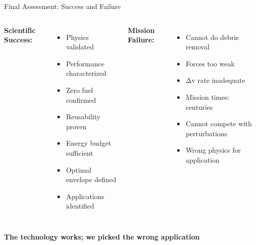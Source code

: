 \documentclass[aspectratio=169]{beamer}
\begin{document}
\begin{frame}{Final Assessment: Success and Failure}
\begin{columns}
\textbf{Scientific Success:}
\begin{itemize}
    \item[\textcolor{green}{\checkmark}] Physics validated
    \item[\textcolor{green}{\checkmark}] Performance characterized
    \item[\textcolor{green}{\checkmark}] Zero fuel confirmed
    \item[\textcolor{green}{\checkmark}] Reusability proven
    \item[\textcolor{green}{\checkmark}] Energy budget sufficient
    \item[\textcolor{green}{\checkmark}] Optimal envelope defined
    \item[\textcolor{green}{\checkmark}] Applications identified
\end{itemize}

\textbf{Mission Failure:}
\begin{itemize}
    \item[\textcolor{red}{\ding{55}}] Cannot do debris removal
    \item[\textcolor{red}{\ding{55}}] Forces too weak
    \item[\textcolor{red}{\ding{55}}] Δv rate inadequate
    \item[\textcolor{red}{\ding{55}}] Mission times: centuries
    \item[\textcolor{red}{\ding{55}}] Cannot compete with perturbations
    \item[\textcolor{red}{\ding{55}}] Wrong physics for application
\end{itemize}
\end{columns}

\vspace{1em}
\begin{center}
\textbf{The technology works; we picked the wrong application}
\end{center}
\end{frame}
\end{document}
